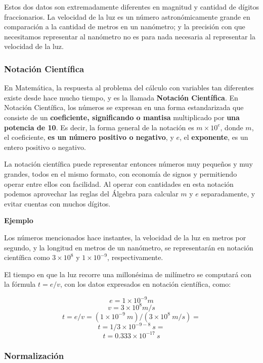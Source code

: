 \documentclass[spanish,A4,]{article}
\begin{document}
Estos dos datos son extremadamente diferentes en magnitud y cantidad de
dígitos fraccionarios. La velocidad de la luz es un número
astronómicamente grande en comparación a la cantidad de metros en un
nanómetro; y la precisión con que necesitamos representar al nanómetro
no es para nada necesaria al representar la velocidad de la luz.

\subsubsection{Notación Científica}\label{notaciuxf3n-cientuxedfica}

En Matemática, la respuesta al problema del cálculo con variables tan
diferentes existe desde hace mucho tiempo, y es la llamada
\textbf{Notación Científica}. En Notación Científica, los números se
expresan en una forma estandarizada que consiste de un
\textbf{coeficiente, significando o mantisa} multiplicado por
\textbf{una potencia de 10}. Es decir, la forma general de la notación
es $m \times 10^e$, donde $m$, el coeficiente, \textbf{es un número
positivo o negativo}, y $e$, el \textbf{exponente}, es un entero
positivo o negativo.

La notación científica puede representar entonces números muy pequeños y
muy grandes, todos en el mismo formato, con economía de signos y
permitiendo operar entre ellos con facilidad. Al operar con cantidades
en esta notación podemos aprovechar las reglas del Álgebra para calcular
$m$ y $e$ separadamente, y evitar cuentas con muchos dígitos.

\textbf{Ejemplo}

Los números mencionados hace instantes, la velocidad de la luz en metros
por segundo, y la longitud en metros de un nanómetro, se representarán
en notación científica como $3\times10^8$ y $1\times10^{-9}$,
respectivamente.

El tiempo en que la luz recorre una millonésima de milímetro se
computará con la fórmula $t = e/v$, con los datos expresados en notación
científica, como:

\[e = 1\times10^{-9}m\] \[v = 3\times10^{8}m/s\]
\[t = e / v = (1 \times 10^{-9}\ m) / (3 \times 10^8\ m/s) = \]
\[t = 1 / 3 \times 10^{-9-8}\ s =\] \[t = 0.333 \times 10^{-17}\ s\]

\subsubsection{Normalización}\label{normalizaciuxf3n}
\end{document}
